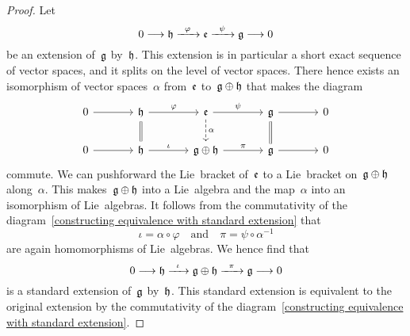 \begin{proof}
	Let
	\[
		0
		\to
		\hlie
		\xto{\varphi}
		\elie
		\xto{\psi}
		\glie
		\to
		0
	\]
	be an extension of~$\mathfrak{g}$ by~$\mathfrak{h}$.
	This extension is in particular a short exact sequence of vector spaces, and it splits on the level of vector spaces.
	There hence exists an isomorphism of vector spaces~$\alpha$ from~$\mathfrak{e}$ to~$\mathfrak{g} \oplus \mathfrak{h}$ that makes the diagram
	\begin{equation}
		\label{constructing equivalence with standard extension}
		\begin{tikzcd}[column sep = large]
			0
			\arrow{r}
			&
			\hlie
			\arrow{r}[above]{\varphi}
			\arrow[equal]{d}
			&
			\elie
			\arrow{r}[above]{\psi}
			\arrow[dashed]{d}[right]{\alpha}
			&
			\glie
			\arrow{r}
			\arrow[equal]{d}
			&
			0
			\\
			0
			\arrow{r}
			&
			\hlie
			\arrow{r}[above]{\iota}
			&
			\glie \oplus \hlie
			\arrow{r}[above]{\pi}
			&
			\glie
			\arrow{r}
			&
			0
		\end{tikzcd}
	\end{equation}
	commute.
	We can pushforward the Lie~bracket of~$\mathfrak{e}$ to a Lie~bracket on~$\mathfrak{g} \oplus \mathfrak{h}$ along~$\alpha$.
	This makes~$\mathfrak{g} \oplus \mathfrak{h}$ into a Lie~algebra and the map~$\alpha$ into an isomorphism of Lie~algebras.
	It follows from the commutativity of the diagram~\eqref{constructing equivalence with standard extension} that
	\[
		\iota = \alpha \circ \varphi
		\quad\text{and}\quad
		\pi = \psi \circ \alpha^{-1}
	\]
	are again homomorphisms of Lie~algebras.
	We hence find that
	\[
		0
		\to
		\hlie
		\xto{\iota}
		\glie \oplus \hlie
		\xto{\pi}
		\glie
		\to
		0
	\]
	is a standard extension of~$\mathfrak{g}$ by~$\mathfrak{h}$.
	This standard extension is equivalent to the original extension by the commutativity of the diagram~\eqref{constructing equivalence with standard extension}.
\end{proof}


